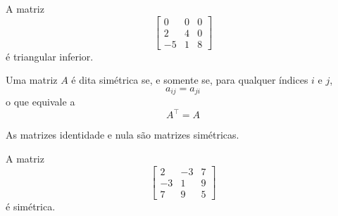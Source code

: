 \begin{exp:triangular2}
A matriz
\[
	\begin{bmatrix}
		0  & 0 & 0 \\
		2  & 4 & 0 \\
		-5 & 1 & 8
	\end{bmatrix}
\]
é triangular inferior.
\end{exp:triangular2}

\begin{def:simetrica}
Uma matriz $A$ é dita simétrica se, e somente se, para qualquer índices $i$ e $j$,
\[
	a_{ij} = a_{ji}
\]
o que equivale a
\[
	A^\top = A
\]
\end{def:simetrica}

\begin{exp:simetrica1}
As matrizes identidade e nula são matrizes simétricas.
\end{exp:simetrica1}

\begin{exp:simetrica2}
A matriz
\[
	\begin{bmatrix}
		2  & -3 & 7 \\
		-3 & 1  & 9 \\
		7  & 9  & 5
	\end{bmatrix}
\]
é simétrica.
\end{exp:simetrica2}
